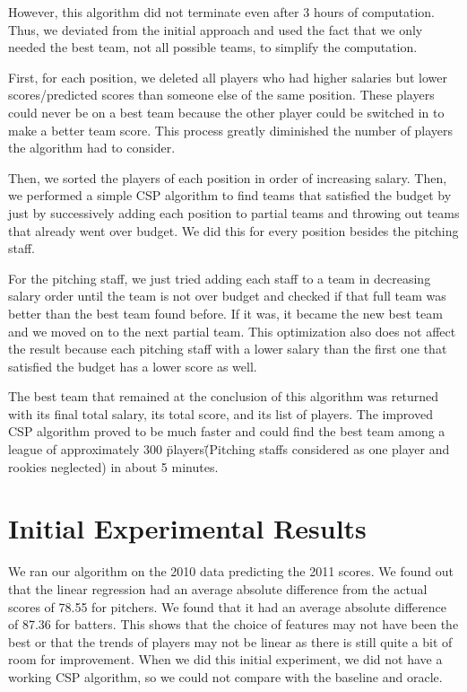 \documentclass[12pt]{amsart}
\begin{document}
However, this algorithm did not terminate even after 3 hours of computation. Thus, we deviated from the initial approach and used the fact that we only needed the best team, not all possible teams, to simplify the computation. 
\vspace{.4cm}

First, for each position, we deleted all players who had higher salaries but lower scores/predicted scores than someone else of the same position. These players could never be on a best team because the other player could be switched in to make a better team score. This process greatly diminished the number of players the algorithm had to consider.
\vspace{.4cm}

Then, we sorted the players of each position in order of increasing salary. Then, we performed a simple CSP algorithm to find teams that satisfied the budget by just by successively adding each position to partial teams and throwing out teams that already went over budget. We did this for every position besides the pitching staff. 
\vspace{.4cm}

For the pitching staff, we just tried adding each staff to a team in decreasing salary order until the team is not over budget and checked if that full team was better than the best team found before. If it was, it became the new best team and we moved on to the next partial team. This optimization also does not affect the result because each pitching staff with a lower salary than the first one that satisfied the budget has a lower score as well. 
\vspace{.4cm}

The best team that remained at the conclusion of this algorithm was returned with its final total salary, its total score, and its list of players. The improved CSP algorithm proved to be much faster and could find the best team among a league of approximately 300 \"players\" (Pitching staffs considered as one player and rookies neglected) in about 5 minutes.

\section{\large Initial Experimental Results}
We ran our algorithm on the 2010 data predicting the 2011 scores. We found out that the linear regression had an average absolute difference from the actual scores of 78.55 for pitchers. We found that it had an average absolute difference of 87.36 for batters. This shows that the choice of features may not have been the best or that the trends of players may not be linear as there is still quite a bit of room for improvement. When we did this initial experiment, we did not have a working CSP algorithm, so we could not compare with the baseline and oracle.
\end{document}
